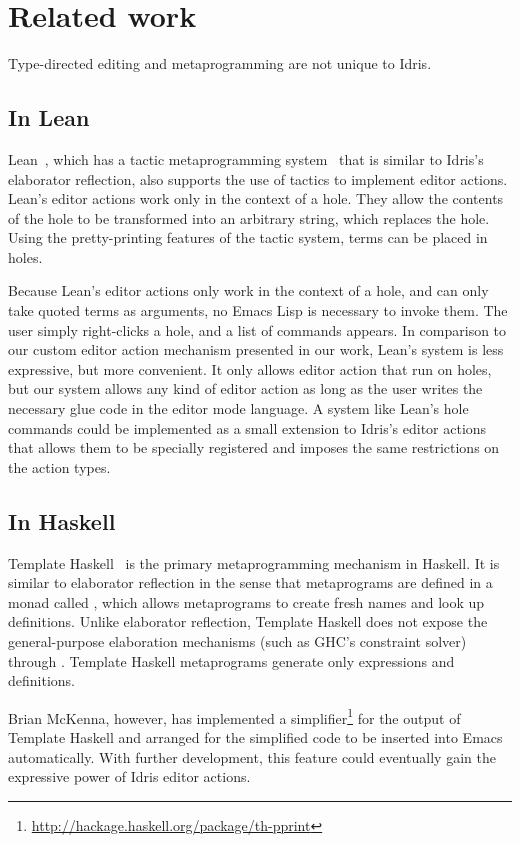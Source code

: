 \section{Related work} \label{sec:relatedwork}

Type-directed editing and metaprogramming are not unique to Idris.


\subsection{In Lean}

Lean~\cite{lean}, which has a tactic metaprogramming
system~\cite{leanmeta} that is similar to Idris's elaborator
reflection, also supports the use of tactics to implement editor
actions.  Lean's editor actions work only in the context of a
hole. They allow the contents of the hole to be transformed into an
arbitrary string, which replaces the hole. Using the pretty-printing
features of the tactic system, terms can be placed in holes.

Because Lean's editor actions only work in the context of a hole, and
can only take quoted terms as arguments, no Emacs Lisp is necessary to
invoke them. The user simply right-clicks a hole, and a list of
commands appears.  In comparison to our custom editor action mechanism
presented in our work, Lean's system is less expressive, but more
convenient.  It only allows editor action that run on holes, but our
system allows any kind of editor action as long as the user writes the
necessary glue code in the editor mode language.
A system like Lean's hole commands could be implemented as a small
extension to Idris's editor actions that allows them to be specially
registered and imposes the same restrictions on the action types.

\subsection{In Haskell}

Template Haskell~\cite{th} is the primary metaprogramming mechanism in
Haskell.  It is similar to elaborator reflection in the sense that
metaprograms are defined in a monad called , which allows
metaprograms to create fresh names and look up definitions.  Unlike
elaborator reflection, Template Haskell does not expose the
general-purpose elaboration mechanisms (such as GHC's constraint
solver) through .  Template Haskell metaprograms generate only
expressions and definitions.

Brian McKenna, however, has implemented a
simplifier\footnote{\url{http://hackage.haskell.org/package/th-pprint}}
for the output of Template Haskell and arranged for the simplified
code to be inserted into Emacs automatically. With further
development, this feature could eventually gain the expressive power
of Idris editor actions.

